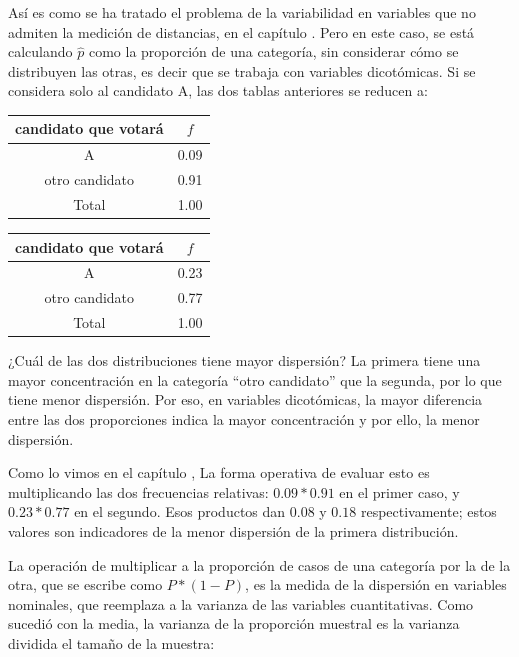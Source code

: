 \documentclass[]{book}
\begin{document}
Así es como se ha tratado el problema de la variabilidad en variables que no
admiten la medición de distancias, en el capítulo . Pero en este caso, se está calculando
\(\widehat{p}\) como la proporción de una categoría, sin considerar cómo
se distribuyen las otras, es decir que se trabaja con variables
dicotómicas. Si se considera solo al candidato A, las dos tablas
anteriores se reducen a:

\begin{table}[H]
\centering
\begin{tabular}{cc}
\toprule
candidato que votará & $f$\\
\midrule
\rowcolor{gray!6}  A & 0.09\\
otro candidato & 0.91\\
\rowcolor{gray!6}  Total & 1.00\\
\bottomrule
\end{tabular}
\end{table}

\begin{table}[H]
\centering
\begin{tabular}{cc}
\toprule
candidato que votará & $f$\\
\midrule
\rowcolor{gray!6}  A & 0.23\\
otro candidato & 0.77\\
\rowcolor{gray!6}  Total & 1.00\\
\bottomrule
\end{tabular}
\end{table}

¿Cuál de las dos distribuciones tiene mayor dispersión? La primera tiene una mayor concentración en la categoría ``otro candidato'' que la segunda, por lo que tiene menor dispersión. Por eso, en variables dicotómicas, la mayor diferencia entre las dos proporciones indica la mayor concentración y por ello, la menor dispersión.

Como lo vimos en el capítulo , La forma operativa de evaluar esto es multiplicando las dos frecuencias
relativas: \(0.09*0.91\) en el primer caso, y \(0.23*0.77\) en el segundo.
Esos productos dan \(0.08\) y \(0.18\) respectivamente; estos valores son
indicadores de la menor dispersión de la primera distribución.

La operación de multiplicar a la proporción de casos de una categoría
por la de la otra, que se escribe como \(P*(1-P)\), es la medida de la
dispersión en variables nominales, que reemplaza a la varianza de las
variables cuantitativas. Como sucedió con la media, la varianza de la
proporción muestral es la varianza dividida el tamaño de la muestra:
\end{document}
